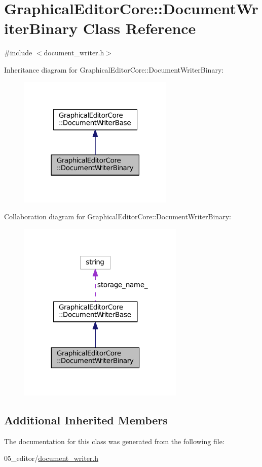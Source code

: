 \hypertarget{classGraphicalEditorCore_1_1DocumentWriterBinary}{}\section{Graphical\+Editor\+Core\+:\+:Document\+Writer\+Binary Class Reference}
\label{classGraphicalEditorCore_1_1DocumentWriterBinary}


{\ttfamily \#include $<$document\+\_\+writer.\+h$>$}



Inheritance diagram for Graphical\+Editor\+Core\+:\+:Document\+Writer\+Binary\+:
\nopagebreak
\begin{figure}[H]
\begin{center}
\leavevmode
\includegraphics[width=210pt]{classGraphicalEditorCore_1_1DocumentWriterBinary__inherit__graph}
\end{center}
\end{figure}


Collaboration diagram for Graphical\+Editor\+Core\+:\+:Document\+Writer\+Binary\+:
\nopagebreak
\begin{figure}[H]
\begin{center}
\leavevmode
\includegraphics[width=224pt]{classGraphicalEditorCore_1_1DocumentWriterBinary__coll__graph}
\end{center}
\end{figure}
\subsection*{Additional Inherited Members}


The documentation for this class was generated from the following file\+:\begin{DoxyCompactItemize}
\item 
05\+\_\+editor/\hyperlink{document__writer_8h}{document\+\_\+writer.\+h}\end{DoxyCompactItemize}
